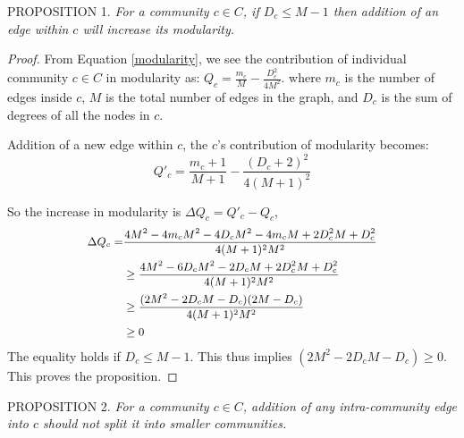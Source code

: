 PROPOSITION 1.
{\em
For a community $c\in C$, if $D_c\leq M-1$ then addition of an edge within $c$ will increase its modularity.}

\begin{proof}
From Equation \ref{modularity}, we see the contribution of individual community $c\in C$ in modularity as: $Q_c=\frac{m_c}{M} - \frac{D_c^2}{4M^2}$. 
where $m_c$ is the number of edges inside $c$, $M$ is the total number of edges in the graph, and $D_c$ is the sum of degrees of all the nodes in $c$. 

Addition of a new edge within $c$, the $c$'s contribution of modularity becomes:
\[
Q'_c=\frac{m_c+1}{M+1} - \frac{(D_c+2)^2}{4(M+1)^2}
\]

So the increase in modularity is $\Delta Q_c=Q'_c-Q_c$,
\[\small
\begin{split}
\Delta Q_c=&\frac{4M^2-4m_cM^2-4D_cM^2-4m_cM+2D_c^2M+D_c^2}{4(M+1)^2M^2}\\
&\geq \frac{4M^2-6D_cM^2-2D_cM+2D_c^2M+D_c^2}{4(M+1)^2M^2}\\
&\geq\frac{(2M^2-2D_cM-D_c)(2M-D_c)}{4(M+1)^2M^2}\\
&\geq 0
\end{split}
\]
The equality holds if $D_c\leq M-1$. This thus implies $(2M^2-2D_cM-D_c)\geq 0$. This proves the proposition.
\end{proof}

PROPOSITION 2.
{\em For a community $c\in C$, addition of any intra-community edge into $c$ should not split it into smaller communities.}


